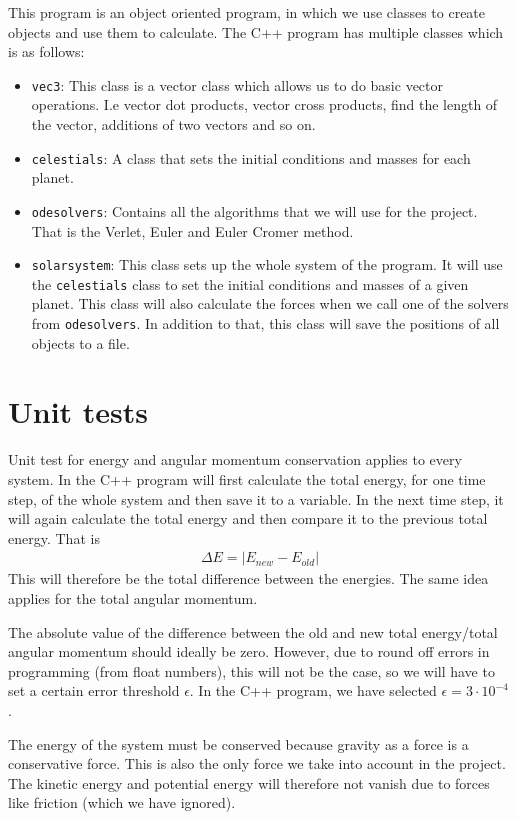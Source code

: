 \documentclass[12pt]{article}
\begin{document}
This program is an object oriented program, in which we use classes to create objects and use them to calculate. The C++ program has multiple classes which is as follows:
\begin{itemize}
\item \texttt{vec3}: This class is a vector class which allows us to do basic vector operations. I.e vector dot products, vector cross products, find the length of the vector, additions of two vectors and so on.
\item \texttt{celestials}: A class that sets the initial conditions and masses for each planet. 
\item \texttt{odesolvers}: Contains all the algorithms that we will use for the project. That is the Verlet, Euler and Euler Cromer method.
\item \texttt{solarsystem}: This class sets up the whole system of the program. It will use the \texttt{celestials} class to set the initial conditions and masses of a given planet. This class will also calculate the forces when we call one of the solvers from \texttt{odesolvers}. In addition to that, this class will save the positions of all objects to a file.
\end{itemize}


\section*{Unit tests}

Unit test for energy and angular momentum conservation applies to every system. In the C++ program will first calculate the total energy, for one time step, of the whole system and then save it to a variable. In the next time step, it will again calculate the total energy and then compare it to the previous total energy. That is
\begin{align*}
\Delta E = |E_{new} - E_{old}|
\end{align*}
This will therefore be the total difference between the energies. The same idea applies for the total angular momentum.

The absolute value of the difference between the old and new total energy/total angular momentum should ideally be zero. However, due to round off errors in programming (from float numbers), this will not be the case, so we will have to set a certain error threshold $\epsilon$. In the C++ program, we have selected $\epsilon = 3\cdot10^{-4}$.

The energy of the system must be conserved because gravity as a force is a conservative force. This is also the only force we take into account in the project. The kinetic energy and potential energy will therefore not vanish due to forces like friction (which we have ignored).
\end{document}
